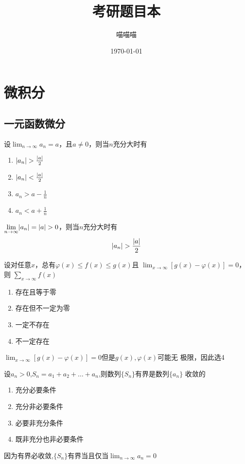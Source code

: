 \documentclass{article}
\author{喵喵喵}
\date{\today}
\title{考研题目本}
\begin{document}
\maketitle
\tableofcontents


\section{微积分}
\label{sec:org4489552}
\subsection{一元函数微分}
\label{sec:org548a12d}
\begin{examplle}[]
设\(\displaystyle\lim_{n\to\infty}a_n=a\)，且\(a\neq0\)，则当\(n\)充分大时有
\begin{enumerate}
\item \(\abs{a_n}\iffalse<\fi>\frac{\abs{a}}{2}\)
\item \(\abs{a_n}<\frac{\abs{a}}{2}\)
\item \(a_n\iffalse<\fi>a-\frac{1}{n}\)
\item \(a_n<a+\frac{1}{n}\)
\end{enumerate}

\(\displaystyle\lim_{n\to\infty}\abs{a_n}=\abs{a}>0\)，则当\(n\)充分大时有
\begin{equation*}
\abs{a_n}>\frac{\abs{a}}{2}
\end{equation*}
\end{examplle}

\begin{examplle}[]
设对任意\(x\)，总有\(\varphi(x)\le f(x)\le g(x)\)且
\(\displaystyle\lim_{x\to\infty}[g(x)-\varphi(x)]=0\)，则
\(\displaystyle\sum_{x\to\infty}f(x)\)
\begin{enumerate}
\item 存在且等于零
\item 存在但不一定为零
\item 一定不存在
\item 不一定存在
\end{enumerate}


\(\displaystyle\lim_{x\to\infty}[g(x)-\varphi(x)]=0\)但是\(g(x),\varphi(x)\)可能无
极限，因此选4
\end{examplle}

\begin{examplle}[]
设\(a_n>0\),\(S_n=a_1+a_2+\dots+a_n\),则数列\(\{S_n\}\)有界是数列\(\{a_n\}\)
收敛的
\begin{enumerate}
\item 充分必要条件
\item 充分非必要条件
\item 必要非充分条件
\item 既非充分也非必要条件
\end{enumerate}


因为有界必收敛,\(\{S_n\}\)有界当且仅当\(\displaystyle\lim_{n\to\infty}a_n=0\)
\end{examplle}
\end{document}

